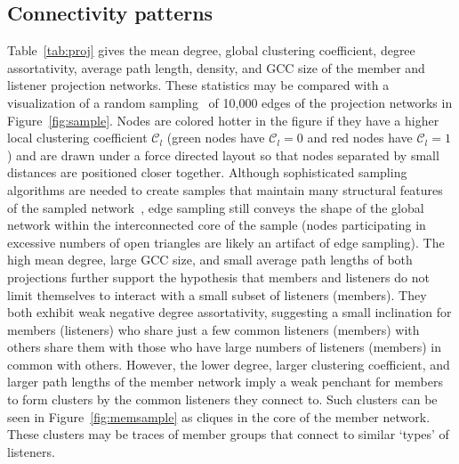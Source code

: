 \subsection{Connectivity patterns}
Table~\ref{tab:proj} gives the mean degree, global clustering coefficient, degree assortativity, average path length, 
density, and GCC size of the member and listener projection networks. 
These statistics may be compared with a visualization of a random sampling~\cite{ahmed2014network} of 
10,000 edges of the projection networks in Figure~\ref{fig:sample}. 
Nodes are colored hotter in the figure if they 
have a higher local clustering coefficient $\mathcal{C}_l$ 
(green nodes have $\mathcal{C}_l = 0$ and red nodes have $\mathcal{C}_l = 1$) 
 and are 
drawn under a force directed layout so that nodes separated by small
distances are positioned closer together. 
Although sophisticated sampling algorithms are needed to create samples that maintain many
structural features of the sampled network~\cite{doran2014triad}, edge sampling still conveys the shape
of the global network within the interconnected core of the sample
(nodes participating in excessive numbers of open triangles are likely an artifact
of edge sampling).  
The high mean degree, large GCC size, and small average path lengths of both projections further
support the hypothesis that members and listeners do not limit themselves to interact 
with a small subset of listeners (members). They both exhibit weak negative degree 
assortativity, suggesting a small inclination
for members (listeners) who share just a few common listeners (members) with others share
them with those who have large numbers of listeners (members) in common with others.
However, the lower degree, larger clustering
coefficient, and larger path lengths of the member network imply a weak penchant for members 
to form clusters by the common listeners they connect to. Such clusters
can be seen in Figure~\ref{fig:memsample} as cliques in the core of 
the member network. 
These clusters may be traces of member groups that connect to similar `types' of listeners. 
